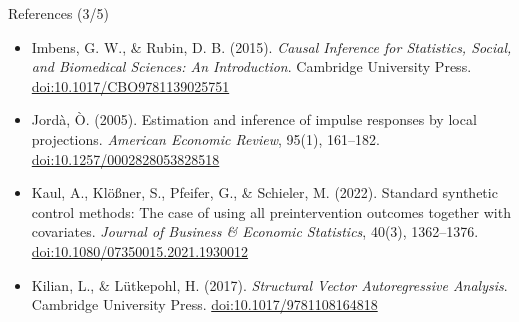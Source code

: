 \begin{frame}{References (3/5)}
\begin{itemize}
    \item Imbens, G. W., \& Rubin, D. B. (2015). \textit{Causal Inference for Statistics, Social, and Biomedical Sciences: An Introduction}. Cambridge University Press. \href{https://doi.org/10.1017/CBO9781139025751}{doi:10.1017/CBO9781139025751}
    \item Jordà, Ò. (2005). Estimation and inference of impulse responses by local projections. \textit{American Economic Review}, 95(1), 161--182. \href{https://doi.org/10.1257/0002828053828518}{doi:10.1257/0002828053828518}
    \item Kaul, A., Klößner, S., Pfeifer, G., \& Schieler, M. (2022). Standard synthetic control methods: The case of using all preintervention outcomes together with covariates. \textit{Journal of Business \& Economic Statistics}, 40(3), 1362--1376. \href{https://doi.org/10.1080/07350015.2021.1930012}{doi:10.1080/07350015.2021.1930012}
    \item Kilian, L., \& Lütkepohl, H. (2017). \textit{Structural Vector Autoregressive Analysis}. Cambridge University Press. \href{https://doi.org/10.1017/9781108164818}{doi:10.1017/9781108164818}
\end{itemize}
\end{frame}


